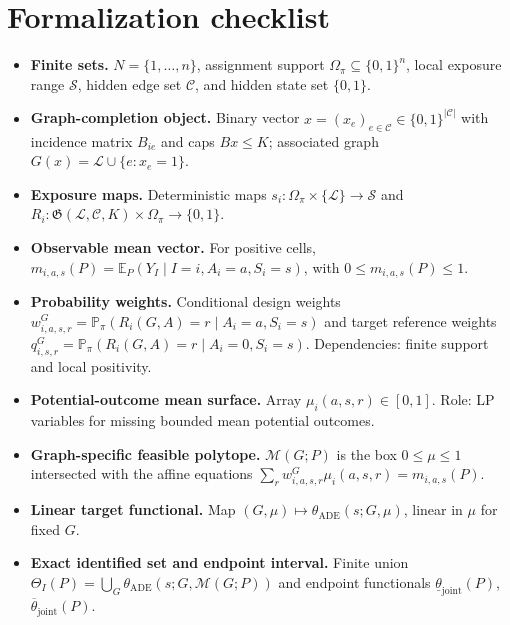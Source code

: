 \documentclass[11pt]{article}
\newcommand{\E}{\mathbb{E}}
\renewcommand{\Pr}{\mathbb{P}}
\theoremstyle{definition}
\theoremstyle{plain}
\theoremstyle{remark}
\begin{document}
\section{Formalization checklist}
\begin{itemize}[leftmargin=*]
\item \textbf{Finite sets.}  \(N=\{1,\ldots,n\}\), assignment support
\(\Omega_\pi\subseteq\{0,1\}^n\), local exposure range \(\mathcal S\), hidden
edge set \(\mathcal C\), and hidden state set \(\{0,1\}\).

\item \textbf{Graph-completion object.}  Binary vector
\(x=(x_e)_{e\in\mathcal C}\in\{0,1\}^{|\mathcal C|}\) with incidence matrix
\(B_{ie}\) and caps \(Bx\le K\); associated graph
\(G(x)=\mathcal L\cup\{e:x_e=1\}\).

\item \textbf{Exposure maps.}  Deterministic maps
\(s_i:\Omega_\pi\times\{\mathcal L\}\to\mathcal S\) and
\(R_i:\mathfrak G(\mathcal L,\mathcal C,K)\times\Omega_\pi\to\{0,1\}\).

\item \textbf{Observable mean vector.}  For positive cells,
\(m_{i,a,s}(P)=\E_P(Y_I\mid I=i,A_i=a,S_i=s)\), with
\(0\le m_{i,a,s}(P)\le1\).

\item \textbf{Probability weights.}  Conditional design weights
\(w^G_{i,a,s,r}=\Pr_\pi(R_i(G,A)=r\mid A_i=a,S_i=s)\) and target reference
weights \(q^G_{i,s,r}=\Pr_\pi(R_i(G,A)=r\mid A_i=0,S_i=s)\).  Dependencies:
finite support and local positivity.

\item \textbf{Potential-outcome mean surface.}  Array
\(\mu_i(a,s,r)\in[0,1]\).  Role: LP variables for missing bounded mean
potential outcomes.

\item \textbf{Graph-specific feasible polytope.}  \(\mathcal M(G;P)\) is the
box \(0\le\mu\le1\) intersected with the affine equations
\(\sum_r w^G_{i,a,s,r}\mu_i(a,s,r)=m_{i,a,s}(P)\).

\item \textbf{Linear target functional.}  Map
\((G,\mu)\mapsto\theta_{\mathrm{ADE}}(s;G,\mu)\), linear in \(\mu\) for fixed
\(G\).

\item \textbf{Exact identified set and endpoint interval.}  Finite union
\(\Theta_I(P)=\bigcup_G\theta_{\mathrm{ADE}}(s;G,\mathcal M(G;P))\) and
endpoint functionals \(\underline\theta_{\mathrm{joint}}(P)\),
\(\overline\theta_{\mathrm{joint}}(P)\).


\end{itemize}
\end{document}
